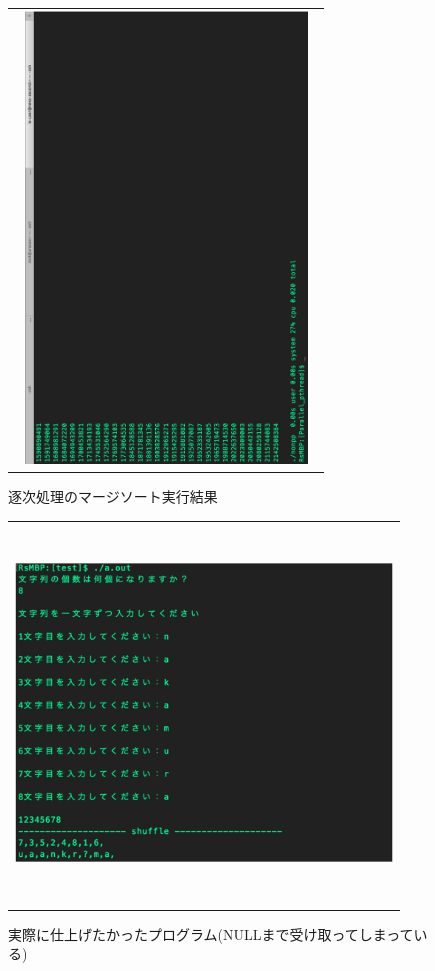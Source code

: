 \documentclass[11pt,a4paper]{jsarticle}
\begin{document}
\begin{figure}[htbp]
 \begin{tabular}{c}
  \begin{minipage}{0.5\hsize}
   \begin{center}
   \includegraphics[width=8cm,height=12cm,angle=270]{image3-crop.pdf}
   \caption{逐次処理のマージソート実行結果}
   \end{center}
  \end{minipage}
 \end{tabular}
\end{figure}

\newpage
\begin{figure}[htbp]
 \begin{tabular}{c}
  \begin{minipage}{0.5\hsize}
   \begin{center}
   \includegraphics[width=10cm,height=10cm,angle=0]{image4-crop.pdf}
   \caption{実際に仕上げたかったプログラム(NULLまで受け取ってしまっている)}
   \end{center}
  \end{minipage}
 \end{tabular}
\end{figure}
\end{document}
